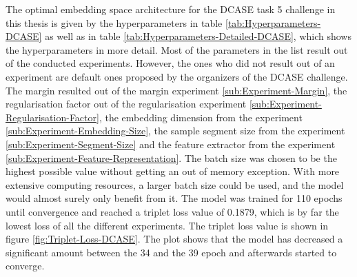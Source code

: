 \noindent
The optimal embedding space architecture for the \gls{DCASE} task 5 challenge in this thesis is given by the hyperparameters in table \ref{tab:Hyperparameters-DCASE} as well as in table \ref{tab:Hyperparameters-Detailed-DCASE}, which shows the hyperparameters in more detail. Most of the parameters in the list result out of the conducted experiments. However, the ones who did not result out of an experiment are default ones proposed by the organizers of the \gls{DCASE} challenge. The margin resulted out of the margin experiment \ref{sub:Experiment-Margin}, the regularisation factor out of the regularisation experiment \ref{sub:Experiment-Regularisation-Factor}, the embedding dimension from the experiment \ref{sub:Experiment-Embedding-Size}, the sample segment size from the experiment \ref{sub:Experiment-Segment-Size} and the feature extractor from the experiment \ref{sub:Experiment-Feature-Representation}. The batch size was chosen to be the highest possible value without getting an out of memory exception. With more extensive computing resources, a larger batch size could be used, and the model would almost surely only benefit from it.
\newline
\newline
The model was trained for 110 epochs until convergence and reached a triplet loss value of 0.1879, which is by far the lowest loss of all the different experiments. The triplet loss value is shown in figure \ref{fig:Triplet-Loss-DCASE}. The plot shows that the model has decreased a significant amount between the 34 and the 39 epoch and afterwards started to converge.

